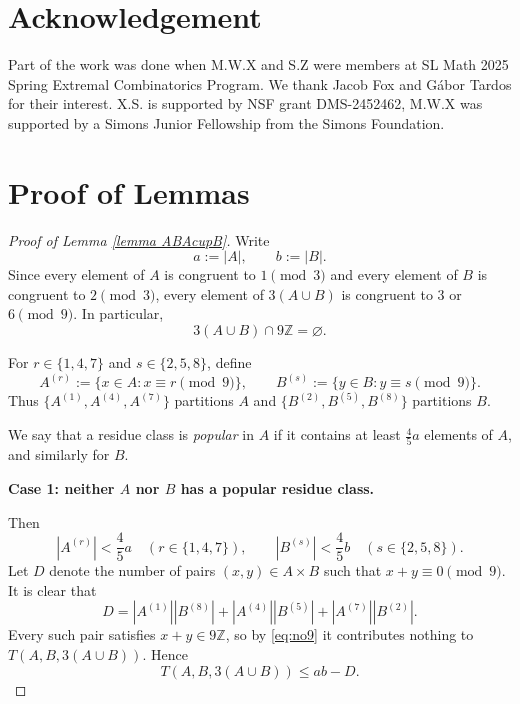 \documentclass[12pt, notitlepage]{amsart}
\numberwithin{equation}{section}
\theoremstyle{remark}
\theoremstyle{definition}
\theoremstyle{remark}
\numberwithin{equation}{section}
\begin{document}
\section*{Acknowledgement}
Part of the work was done when M.W.X and S.Z
were members at SL Math 2025 Spring Extremal Combinatorics Program. We thank Jacob Fox and G\'abor Tardos for their interest. X.S. is supported by NSF grant DMS-2452462, M.W.X was supported by a Simons Junior Fellowship from the Simons Foundation.

\appendix	
	\section{Proof of Lemmas} 


\begin{proof}[Proof of Lemma \ref{lemma ABAcupB}]
Write
\[
a:=|A|,\qquad b:=|B|.
\]
Since every element of $A$ is congruent to $1 \pmod 3$ and every element of $B$ is congruent to $2 \pmod 3$, every element of $3(A\cup B)$ is congruent to $3$ or $6 \pmod 9$. In particular,
\begin{equation}
\label{eq:no9}
3(A\cup B)\cap 9\mathbb Z=\varnothing.
\end{equation}

For $r\in\{1,4,7\}$ and $s\in\{2,5,8\}$, define
\[
A^{(r)}:=\{x\in A:x\equiv r \pmod 9\},\qquad
B^{(s)}:=\{y\in B:y\equiv s \pmod 9\}.
\]
Thus $\{A^{(1)},A^{(4)},A^{(7)}\}$ partitions $A$ and $\{B^{(2)},B^{(5)},B^{(8)}\}$ partitions $B$.

We say that a residue class is \emph{popular} in $A$ if it contains at least $\frac45a$ elements of $A$, and similarly for $B$.

\medskip
\noindent\textbf{Case 1: neither $A$ nor $B$ has a popular residue class.}

Then
\[
|A^{(r)}|<\frac45a\quad (r\in\{1,4,7\}),\qquad
|B^{(s)}|<\frac45b\quad (s\in\{2,5,8\}).
\]
Let $D$ denote the number of pairs $(x,y)\in A\times B$ such that $x+y\equiv 0\pmod 9$. It is clear that
\[
D=|A^{(1)}||B^{(8)}|+|A^{(4)}||B^{(5)}|+|A^{(7)}||B^{(2)}|.
\]
Every such pair satisfies $x+y\in 9\mathbb Z$, so by \eqref{eq:no9} it contributes nothing to $T(A,B,3(A\cup B))$. Hence
\begin{equation}
\label{eq:TleabminusD}
T(A,B,3(A\cup B))\le ab-D.
\end{equation}


\end{proof}
\end{document}

